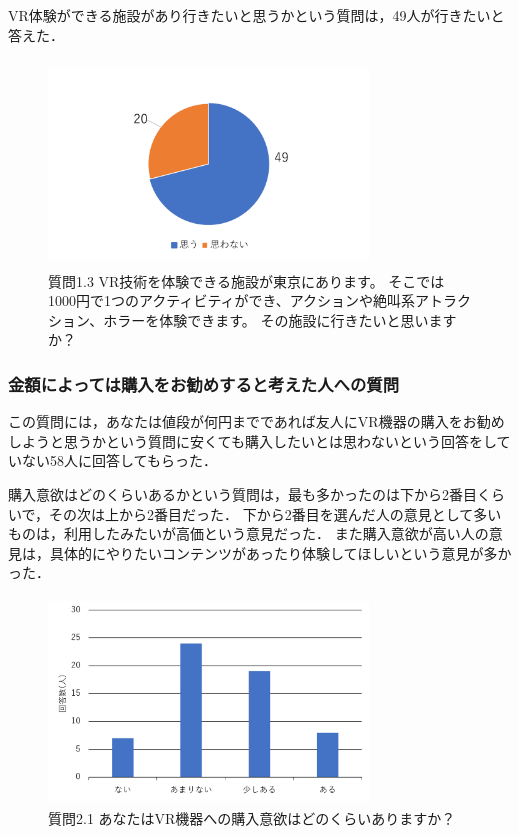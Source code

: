 \documentclass[12pt,a4j]{ltjsarticle}
\begin{document}
VR体験ができる施設があり行きたいと思うかという質問は，49人が行きたいと答えた．

\begin{figure}[h]
\begin{center}
 \includegraphics[clip,width=85mm,height=55mm]{
 アンケート2_1_3.pdf}
\end{center}
 \caption{質問1.3 VR技術を体験できる施設が東京にあります。
そこでは1000円で1つのアクティビティができ、アクションや絶叫系アトラクション、ホラーを体験できます。
その施設に行きたいと思いますか？}
 \label{fig:アンケート2_1_3.pdf}
\end{figure}

\subsubsection{金額によっては購入をお勧めすると考えた人への質問}
この質問には，あなたは値段が何円までであれば友人にVR機器の購入をお勧めしようと思うかという質問に安くても購入したいとは思わないという回答をしていない58人に回答してもらった．

購入意欲はどのくらいあるかという質問は，最も多かったのは下から2番目くらいで，その次は上から2番目だった．
下から2番目を選んだ人の意見として多いものは，利用したみたいが高価という意見だった．
また購入意欲が高い人の意見は，具体的にやりたいコンテンツがあったり体験してほしいという意見が多かった．

\begin{figure}[h]
\begin{center}
 \includegraphics[clip,width=85mm,height=55mm]{
 アンケート2_2_1.pdf}
\end{center}
 \caption{質問2.1 あなたはVR機器への購入意欲はどのくらいありますか？}
 \label{fig:アンケート2_2_1.pdf}
\end{figure}
\end{document}

